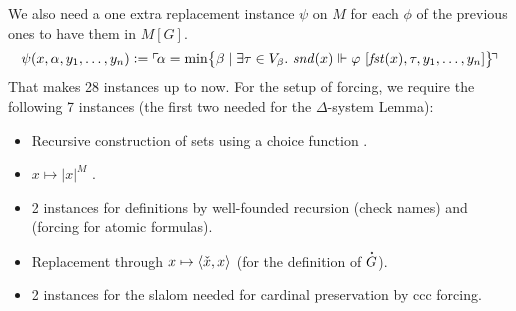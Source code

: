 We also need a one extra replacement instance $\psi$ on $M$ for each
$\phi$ of the
previous ones to have them in $M[G]$.
\[
  \psi(x,\alpha,y_1,\dots,y_n) \mathrel{\mathop:}= \ulcorner{\!\alpha = \min \bigl\{
    \beta \mid \exists\tau\in V_\beta.\  \mathit{snd}(x) \Vdash\varphi\ [\mathit{fst}(x),\tau,y_1,\dots,y_n]\bigr\}\!}\urcorner
\]
That makes 28 instances up to now. For the setup of forcing, we
require the following 7 instances (the first two needed for the $\Delta$-system Lemma):

\begin{itemize}
\item Recursive construction of sets using a choice function
  .
\item $x\mapsto |x|^M$
  .
\item 2 instances for definitions by well-founded recursion  (check
  names) and  (forcing for atomic formulas).
\item Replacement through $x\mapsto \langle\check{x},x\rangle$
   (for the
  definition of $\punto{G}$).
\item 2 instances for the slalom needed for cardinal preservation
  by ccc forcing.
\end{itemize}

